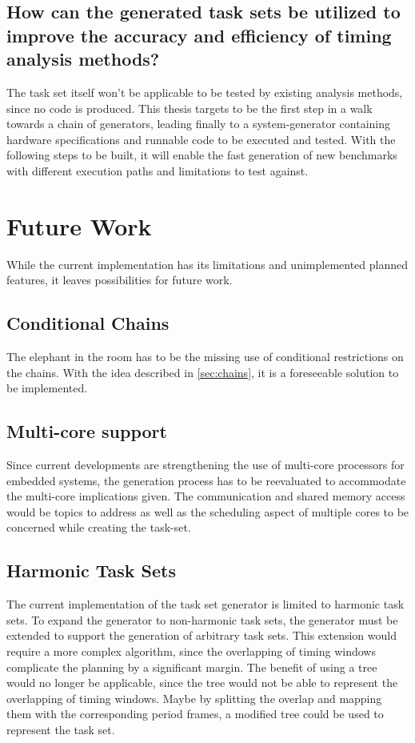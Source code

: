 \subsection{How can the generated task sets be utilized to improve the accuracy and efficiency of timing analysis methods?}\label{subsec:summary:Q4}
The task set itself won't be applicable to be tested by existing analysis methods, since no code is produced.
This thesis targets to be the first step in a walk towards a chain of generators, leading finally to a system-generator containing hardware specifications and runnable code to be executed and tested.
With the following steps to be built, it will enable the fast generation of new benchmarks with different execution paths and limitations to test against.

\section{Future Work}\label{sec:future_work}
While the current implementation has its limitations and unimplemented planned features, it leaves possibilities for future work.

\subsection{Conditional Chains}\label{subsec:future_work:conditional_chains}
The elephant in the room has to be the missing use of conditional restrictions on the chains.
With the idea described in \cref{sec:chains}, it is a foreseeable solution to be implemented.

\subsection{Multi-core support}\label{subsec:future_work:multicore}
Since current developments are strengthening the use of multi-core processors for embedded systems, the generation process has to be reevaluated to accommodate the multi-core implications given.
The communication and shared memory access would be topics to address as well as the scheduling aspect of multiple cores to be concerned while creating the task-set.

\subsection{Harmonic Task Sets}\label{subsec:future_work:harmonic_task_sets}
The current implementation of the task set generator is limited to harmonic task sets.
To expand the generator to non-harmonic task sets, the generator must be extended to support the generation of arbitrary task sets.
This extension would require a more complex algorithm, since the overlapping of timing windows complicate the planning by a significant margin.
The benefit of using a tree would no longer be applicable, since the tree would not be able to represent the overlapping of timing windows.
Maybe by splitting the overlap and mapping them with the corresponding period frames, a modified tree could be used to represent the task set.

